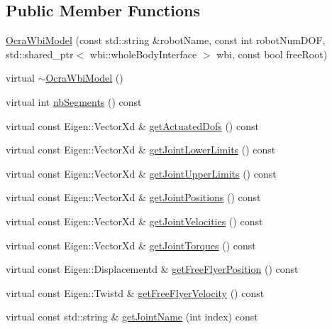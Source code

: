 \subsection*{\-Public \-Member \-Functions}
\begin{DoxyCompactItemize}
\item 
\hyperlink{classocra__icub_1_1OcraWbiModel_a57a4f0f140f56d7ec0a00b31e16f9673}{\-Ocra\-Wbi\-Model} (const std\-::string \&robot\-Name, const int robot\-Num\-D\-O\-F, std\-::shared\-\_\-ptr$<$ wbi\-::whole\-Body\-Interface $>$ wbi, const bool free\-Root)
\item 
virtual \hyperlink{classocra__icub_1_1OcraWbiModel_ade110b2e003ccd49d2baa4f56a954e4b}{$\sim$\-Ocra\-Wbi\-Model} ()
\item 
virtual int \hyperlink{classocra__icub_1_1OcraWbiModel_adf952842e3c031a5000ee37c51fe9b77}{nb\-Segments} () const 
\item 
virtual const \-Eigen\-::\-Vector\-Xd \& \hyperlink{classocra__icub_1_1OcraWbiModel_aecb11984be8a80c66b45d37f5fb992ce}{get\-Actuated\-Dofs} () const 
\item 
virtual const \-Eigen\-::\-Vector\-Xd \& \hyperlink{classocra__icub_1_1OcraWbiModel_a7eeb8088b632036c56841cee96aef7ff}{get\-Joint\-Lower\-Limits} () const 
\item 
virtual const \-Eigen\-::\-Vector\-Xd \& \hyperlink{classocra__icub_1_1OcraWbiModel_aa9303621ea64de2378780e2f5e6618b6}{get\-Joint\-Upper\-Limits} () const 
\item 
virtual const \-Eigen\-::\-Vector\-Xd \& \hyperlink{classocra__icub_1_1OcraWbiModel_adeacb1988bd5a4edfde5ec30caae2df3}{get\-Joint\-Positions} () const 
\item 
virtual const \-Eigen\-::\-Vector\-Xd \& \hyperlink{classocra__icub_1_1OcraWbiModel_a403d66cbc41b7cc5e1323c49d578e447}{get\-Joint\-Velocities} () const 
\item 
virtual const \-Eigen\-::\-Vector\-Xd \& \hyperlink{classocra__icub_1_1OcraWbiModel_a639baccfdc1ca6409e14a4839e0394fe}{get\-Joint\-Torques} () const 
\item 
virtual const \*
\-Eigen\-::\-Displacementd \& \hyperlink{classocra__icub_1_1OcraWbiModel_a3e9c4db6d1ee56984fea44cdd592a1ac}{get\-Free\-Flyer\-Position} () const 
\item 
virtual const \-Eigen\-::\-Twistd \& \hyperlink{classocra__icub_1_1OcraWbiModel_a9fbfa4c9da43f0b1957f25d8ecb792d9}{get\-Free\-Flyer\-Velocity} () const 
\item 
virtual const std\-::string \& \hyperlink{classocra__icub_1_1OcraWbiModel_a83d6bc29496259e0f23cc085e29aa431}{get\-Joint\-Name} (int index) const 

\end{DoxyCompactItemize}
